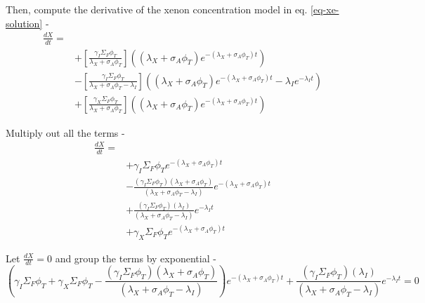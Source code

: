 \documentclass[11pt,a4paper]{article}
\begin{document}
\noindent Then, compute the derivative of the xenon concentration model in eq. \ref{eq-xe-solution} - 
\begin{equation} \label{eq-xe-derivative}
    \begin{aligned}
        \frac{dX}{dt}=\\
        & +[\frac{\gamma_I\Sigma_F\phi_T}{\lambda_X+\sigma_A\phi_T}]((\lambda_X+\sigma_A\phi_T)e^{-(\lambda_X+\sigma_A\phi_T)t}) \\
        & -[\frac{\gamma_I\Sigma_F\phi_T}{\lambda_X+\sigma_A\phi_T-\lambda_I}]((\lambda_X+\sigma_A\phi_T)e^{-(\lambda_X+\sigma_A\phi_T)t}-\lambda_Ie^{-\lambda_I t}) \\ 
        & +[\frac{\gamma_X\Sigma_F\phi_T}{\lambda_X+\sigma_A\phi_T}]((\lambda_X+\sigma_A\phi_T)e^{-(\lambda_X+\sigma_A\phi_T)t})
    \end{aligned}
\end{equation}
\vspace{\baselineskip}

\noindent Multiply out all the terms - 
\begin{equation}
    \begin{aligned}
        \frac{dX}{dt}=\\
        & +\gamma_I\Sigma_F\phi_T e^{-(\lambda_X+\sigma_A\phi_T)t} \\
        & -\frac{(\gamma_I\Sigma_F\phi_T)(\lambda_X+\sigma_A\phi_T)}{(\lambda_X+\sigma_A\phi_T-\lambda_I)}e^{-(\lambda_X+\sigma_A\phi_T)t} \\
        & +\frac{(\gamma_I\Sigma_F\phi_T)(\lambda_I)}{(\lambda_X+\sigma_A\phi_T-\lambda_I)}e^{-\lambda_I t} \\
        & +\gamma_X\Sigma_F\phi_T e^{-(\lambda_X+\sigma_A\phi_T)t}
    \end{aligned}
\end{equation}
\vspace{\baselineskip}

\noindent Let $\frac{dX}{dt} = 0$ and group the terms by exponential -
\begin{equation}
    (\gamma_I\Sigma_F\phi_T+\gamma_X\Sigma_F\phi_T-\frac{(\gamma_I\Sigma_F\phi_T)(\lambda_X+\sigma_A\phi_T)}{(\lambda_X+\sigma_A\phi_T-\lambda_I)})e^{-(\lambda_X+\sigma_A\phi_T)t}+\frac{(\gamma_I\Sigma_F\phi_T)(\lambda_I)}{(\lambda_X+\sigma_A\phi_T-\lambda_I)}e^{-\lambda_I t}=0
\end{equation}
\vspace{\baselineskip}
\end{document}
